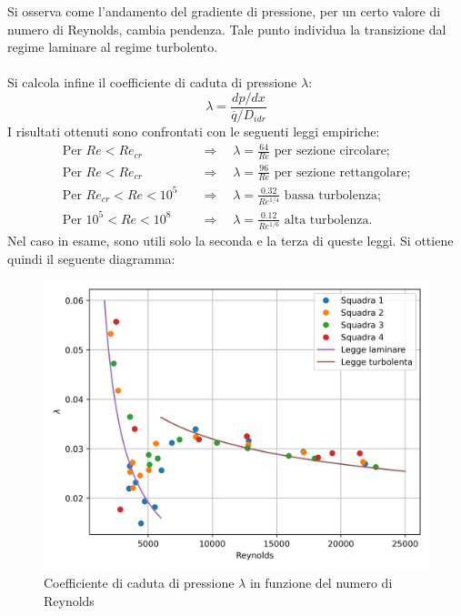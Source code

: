 \noindent Si osserva come l'andamento del gradiente di pressione, per un certo valore di numero di Reynolds, cambia pendenza. Tale punto individua la transizione dal regime laminare al regime turbolento.\\\\
Si calcola infine il coefficiente di caduta di pressione $\lambda$:
\begin{equation*}
    \lambda = \frac{dp/dx}{\overline q/D_{idr}}
\end{equation*}
I risultati ottenuti sono confrontati con le seguenti leggi empiriche:
\begin{equation*}
    \begin{split}
        \text{Per } Re < Re_{cr} \quad &\Rightarrow \quad \lambda = \frac{64}{Re} \text{ per sezione circolare;}\\
        \text{Per } Re < Re_{cr} \quad &\Rightarrow \quad \lambda = \frac{96}{Re} \text{ per sezione rettangolare;}\\
        \text{Per } Re_{cr} < Re < 10^5 \quad &\Rightarrow \quad \lambda = \frac{0.32}{Re^{1/4}} \text{ bassa turbolenza;}\\
        \text{Per } 10^5 < Re < 10^8 \quad &\Rightarrow \quad \lambda = \frac{0.12}{Re^{1/6}} \text{ alta turbolenza.}
    \end{split}
\end{equation*}
Nel caso in esame, sono utili solo la seconda e la terza di queste leggi. Si ottiene quindi il seguente diagramma:
\begin{figure}[H]
    \centering
    \includegraphics[width=.92\textwidth]{images/7/lambda.png}
    \caption{Coefficiente di caduta di pressione $\lambda$ in funzione del numero di Reynolds}
\end{figure}

